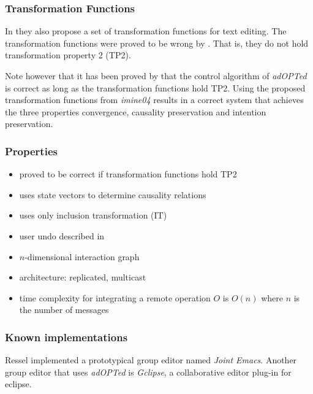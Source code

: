 \subsubsection{Transformation Functions}
In \cite{ressel96} they also propose a set of transformation functions for text editing. The transformation functions were proved to be wrong by \cite{imine03}. That is, they do not hold transformation property 2 (TP2). 

Note however that it has been proved by \cite{cormack02} that the control algorithm of \emph{adOPTed} is correct as long as the transformation functions hold TP2. Using the proposed transformation functions from \emph{imine04} results in a correct system that achieves the three properties convergence, causality preservation and intention preservation.


\subsubsection{Properties}
\begin{itemize}
 \item proved to be correct if transformation functions hold TP2
 \item uses state vectors to determine causality relations
 \item uses only inclusion transformation (IT)
 \item user undo described in \cite{ressel99}
 \item $n$-dimensional interaction graph
 \item architecture: replicated, multicast
 \item time complexity for integrating a remote operation $O$ is $O(n)$ 
       where $n$ is the number of messages
\end{itemize}


\subsubsection{Known implementations}
Ressel implemented a prototypical group editor named \emph{Joint Emacs}. Another group editor that uses \emph{adOPTed} is \emph{Gclipse}, a collaborative editor plug-in for eclipse.
